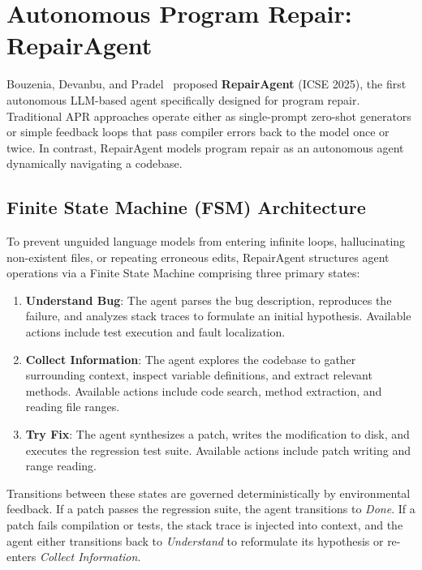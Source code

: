 \documentclass[12pt,a4paper]{report}
\begin{document}
\section{Autonomous Program Repair: RepairAgent}
Bouzenia, Devanbu, and Pradel~\cite{bouzenia2025repairagent} proposed \textbf{RepairAgent} (ICSE 2025), the first autonomous LLM-based agent specifically designed for program repair. Traditional APR approaches operate either as single-prompt zero-shot generators or simple feedback loops that pass compiler errors back to the model once or twice. In contrast, RepairAgent models program repair as an autonomous agent dynamically navigating a codebase.

\subsection{Finite State Machine (FSM) Architecture}
To prevent unguided language models from entering infinite loops, hallucinating non-existent files, or repeating erroneous edits, RepairAgent structures agent operations via a Finite State Machine comprising three primary states:
\begin{enumerate}
    \item \textbf{Understand Bug}: The agent parses the bug description, reproduces the failure, and analyzes stack traces to formulate an initial hypothesis. Available actions include test execution and fault localization.
    \item \textbf{Collect Information}: The agent explores the codebase to gather surrounding context, inspect variable definitions, and extract relevant methods. Available actions include code search, method extraction, and reading file ranges.
    \item \textbf{Try Fix}: The agent synthesizes a patch, writes the modification to disk, and executes the regression test suite. Available actions include patch writing and range reading.
\end{enumerate}

Transitions between these states are governed deterministically by environmental feedback. If a patch passes the regression suite, the agent transitions to \textit{Done}. If a patch fails compilation or tests, the stack trace is injected into context, and the agent either transitions back to \textit{Understand} to reformulate its hypothesis or re-enters \textit{Collect Information}.
\end{document}
